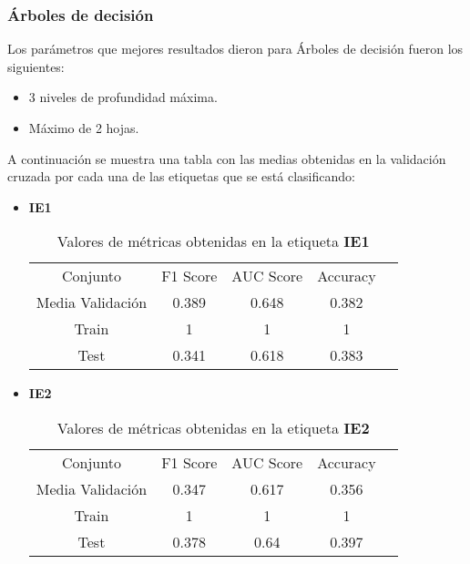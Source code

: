 \subsubsection*{Árboles de decisión}
Los parámetros que mejores resultados dieron para Árboles de decisión fueron los siguientes:
\begin{itemize}
	\item 3 niveles de profundidad máxima.
	\item Máximo de 2 hojas.
\end{itemize}
A continuación se muestra una tabla con las medias obtenidas en la validación cruzada por cada una de las etiquetas que se está clasificando:
\begin{itemize}
	\item \textbf{IE1}
	      \begin{table}[H]
		      \centering
		      \begin{tabular}{|c|c|c|c|c}
			      \cline{1-4}
			      Conjunto         & F1 Score & AUC Score & Accuracy \\ \cline{1-4}
			      Media Validación & 0.389    & 0.648     & 0.382    \\ \cline{1-4}
			      Train            & 1        & 1         & 1        \\ \cline{1-4}
			      Test             & 0.341    & 0.618     & 0.383    \\ \cline{1-4}
		      \end{tabular}
		      \caption{Valores de métricas obtenidas en la etiqueta \textbf{IE1}}
	      \end{table}
	\item  \textbf{IE2}
	      \begin{table}[H]
		      \centering
		      \begin{tabular}{|c|c|c|c|c}
			      \cline{1-4}
			      Conjunto         & F1 Score & AUC Score & Accuracy \\ \cline{1-4}
			      Media Validación & 0.347    & 0.617     & 0.356    \\ \cline{1-4}
			      Train            & 1        & 1         & 1        \\ \cline{1-4}
			      Test             & 0.378    & 0.64      & 0.397    \\ \cline{1-4}
		      \end{tabular}
		      \caption{Valores de métricas obtenidas en la etiqueta \textbf{IE2}}
	      \end{table}


\end{itemize}
